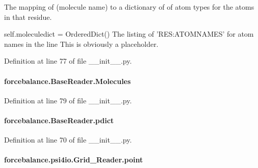 The mapping of (molecule name) to a dictionary of of atom types for the atoms in that residue. 

self.\-moleculedict = Ordered\-Dict() The listing of 'R\-E\-S\-:A\-T\-O\-M\-N\-A\-M\-E\-S' for atom names in the line This is obviously a placeholder. 

Definition at line 77 of file \-\_\-\-\_\-init\-\_\-\-\_\-.\-py.

\hypertarget{classforcebalance_1_1BaseReader_a4369b5fb663a83b11602daa71db6862e}{
\paragraph[{Molecules}]{\setlength{\rightskip}{0pt plus 5cm}forcebalance.\-Base\-Reader.\-Molecules\hspace{0.3cm}{\ttfamily [inherited]}}}\label{classforcebalance_1_1BaseReader_a4369b5fb663a83b11602daa71db6862e}


Definition at line 79 of file \-\_\-\-\_\-init\-\_\-\-\_\-.\-py.

\hypertarget{classforcebalance_1_1BaseReader_aaf18c900d6055ed4b5124f6bb26164c1}{
\paragraph[{pdict}]{\setlength{\rightskip}{0pt plus 5cm}forcebalance.\-Base\-Reader.\-pdict\hspace{0.3cm}{\ttfamily [inherited]}}}\label{classforcebalance_1_1BaseReader_aaf18c900d6055ed4b5124f6bb26164c1}


Definition at line 70 of file \-\_\-\-\_\-init\-\_\-\-\_\-.\-py.

\hypertarget{classforcebalance_1_1psi4io_1_1Grid__Reader_a556a1786a7db1a738a680a784696bf2e}{
\paragraph[{point}]{\setlength{\rightskip}{0pt plus 5cm}forcebalance.\-psi4io.\-Grid\-\_\-\-Reader.\-point}}\label{classforcebalance_1_1psi4io_1_1Grid__Reader_a556a1786a7db1a738a680a784696bf2e}


